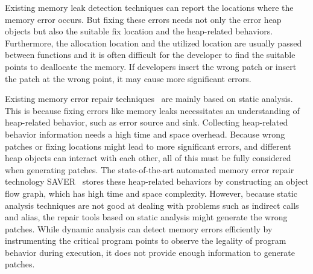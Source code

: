 \documentclass[a4paper,11pt,oneside,openany]{book}
\begin{document}
Existing memory leak detection techniques can report the locations where the memory error occurs. But fixing these errors needs not only the error heap objects but also the suitable fix location and the heap-related behaviors.  Furthermore, the allocation location and the utilized location are usually passed between functions and it is often difficult for the developer to find the suitable points to deallocate the memory. If developers insert the wrong patch or insert the patch at the wrong point, it may cause more significant errors.

Existing memory error repair techniques~\cite{SAVER,Memfix} are mainly based on static analysis. This is because fixing errors like memory leaks necessitates an understanding of heap-related behavior, such as error source and sink. Collecting heap-related behavior information needs a high time and space overhead. Because wrong patches or fixing locations might lead to more significant errors, and different heap objects can interact with each other, all of this must be fully considered when generating patches. The state-of-the-art automated memory error repair technology SAVER~\cite{SAVER} stores these heap-related behaviors by constructing an object flow graph, which has high time and space complexity. However, because static analysis techniques are not good at dealing with problems such as indirect calls and alias, the repair tools based on static analysis might generate the wrong patches. While dynamic analysis can detect memory errors efficiently by instrumenting the critical program points to observe the legality of program behavior during execution, it does not provide enough information to generate patches.
\end{document}

